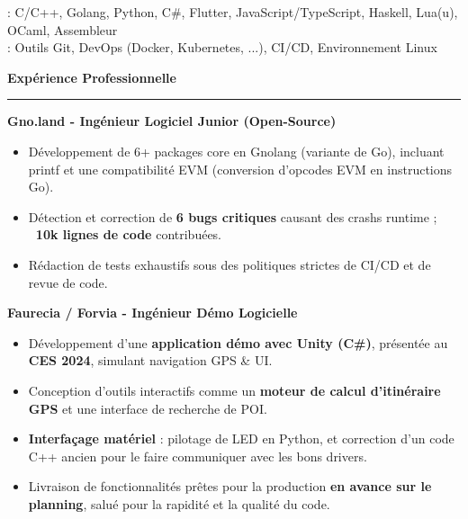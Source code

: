 \documentclass[9pt]{extarticle}
\begin{document}
\hspace*{5pt}{\bfseries Techniques}: C/C++, Golang, Python, C\#, Flutter, JavaScript/TypeScript, Haskell, Lua(u), OCaml, Assembleur
\\
\hspace*{5pt}{\bfseries Autres}: Outils Git, DevOps (Docker, Kubernetes, ...), CI/CD, Environnement Linux

\par\vspace{5pt}


{\large\bfseries Expérience Professionnelle}
\par\vspace{-8pt}
\rule{\linewidth}{0.4pt}
\par\vspace{5pt}

{\bfseries Gno.land - Ingénieur Logiciel Junior (Open-Source)}
\begin{itemize}[noitemsep, topsep=0pt]
	\item Développement de 6+ packages core en Gnolang (variante de Go), incluant printf et une compatibilité EVM (conversion d'opcodes EVM en instructions Go).
	\item Détection et correction de {\bfseries 6 bugs critiques} causant des crashs runtime ; {\bfseries ~10k lignes de code} contribuées.
	\item Rédaction de tests exhaustifs sous des politiques strictes de CI/CD et de revue de code.
\end{itemize}

\par\vspace{5pt}

{\bfseries Faurecia / Forvia - Ingénieur Démo Logicielle}
\begin{itemize}[noitemsep, topsep=0pt]
	\item Développement d'une {\bfseries application démo avec Unity (C\#)}, présentée au {\bfseries CES 2024}, simulant navigation GPS \& UI.
	\item Conception d'outils interactifs comme un {\bfseries moteur de calcul d'itinéraire GPS} et une interface de recherche de POI.
	\item {\bfseries Interfaçage matériel} : pilotage de LED en Python, et correction d'un code C++ ancien pour le faire communiquer avec les bons drivers.
	\item Livraison de fonctionnalités prêtes pour la production {\bfseries en avance sur le planning}, salué pour la rapidité et la qualité du code.
\end{itemize}
\end{document}

